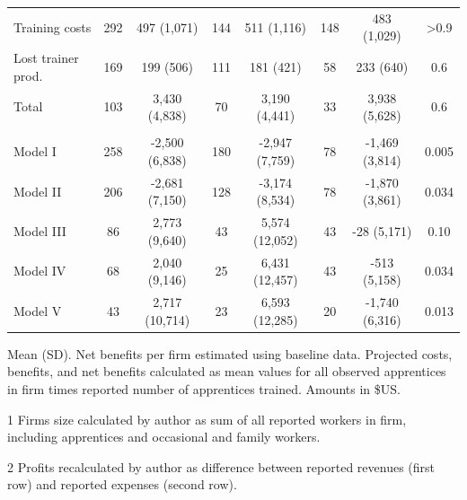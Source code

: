 \documentclass[
  11pt,
a4paper
]{report}
\begin{document}
\begin{table}[H]
{\begin{threeparttable}
\begin{tabular}[t]{lccccccc}
\hspace{1em}Training costs & 292 & 497 (1,071) & 144 & 511 (1,116) & 148 & 483 (1,029) & >0.9\\
\hspace{1em}Lost trainer prod. & 169 & 199 (506) & 111 & 181 (421) & 58 & 233 (640) & 0.6\\
\hspace{1em}Total & 103 & 3,430 (4,838) & 70 & 3,190 (4,441) & 33 & 3,938 (5,628) & 0.6\\
\addlinespace[0.3em]
\multicolumn{8}{l}{\textbf{Net benefits}}\\
\hspace{1em}Model I & 258 & -2,500 (6,838) & 180 & -2,947 (7,759) & 78 & -1,469 (3,814) & 0.005\\
\hspace{1em}Model II & 206 & -2,681 (7,150) & 128 & -3,174 (8,534) & 78 & -1,870 (3,861) & 0.034\\
\hspace{1em}Model III & 86 & 2,773 (9,640) & 43 & 5,574 (12,052) & 43 & -28 (5,171) & 0.10\\
\hspace{1em}Model IV & 68 & 2,040 (9,146) & 25 & 6,431 (12,457) & 43 & -513 (5,158) & 0.034\\
\hspace{1em}Model V & 43 & 2,717 (10,714) & 23 & 6,593 (12,285) & 20 & -1,740 (6,316) & 0.013\\
\bottomrule
\end{tabular}
\begin{tablenotes}
\small
\item Mean (SD). Net benefits per firm estimated using baseline data. 
Projected costs, benefits, and net benefits calculated as mean values for all observed apprentices in 
firm times reported number of apprentices trained. Amounts in \$US.
\item[1] Firms size calculated by author as sum of all reported workers in firm, including apprentices and occasional and family workers.
\item[2] Profits recalculated by author as difference between reported revenues (first row) and reported expenses (second row).
\end{tablenotes}
\end{threeparttable}}
\end{table}
\end{document}
